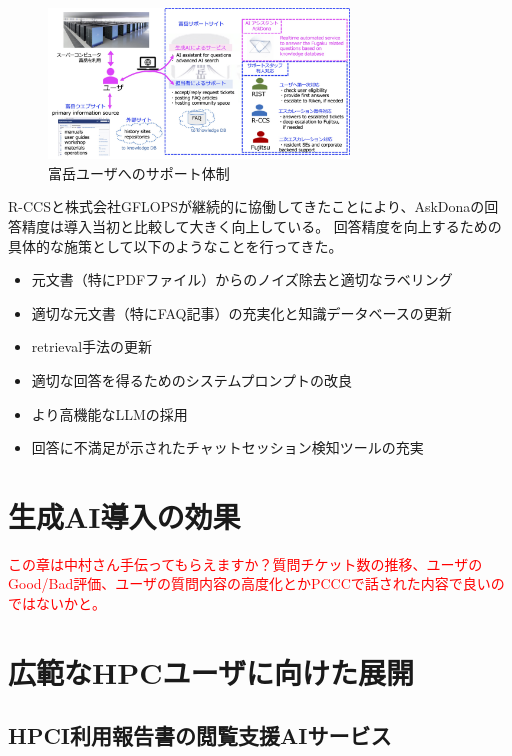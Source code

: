 \documentclass{jsaxiesproc}
\begin{document}
\begin{figure}[htbp]
\includegraphics[width=8.0cm]{figs/FugakuSupport-ALL-J.jpg}
\caption{富岳ユーザへのサポート体制}
\label{fig:FugakuSupport-ALL-J.jpg}
\end{figure}


R-CCSと株式会社GFLOPSが継続的に協働してきたことにより、AskDonaの回答精度は導入当初と比較して大きく向上している。
回答精度を向上するための具体的な施策として以下のようなことを行ってきた。

\begin{itemize}
	\item 元文書（特にPDFファイル）からのノイズ除去と適切なラベリング
	\item 適切な元文書（特にFAQ記事）の充実化と知識データベースの更新
	\item retrieval手法の更新
	\item 適切な回答を得るためのシステムプロンプトの改良
	\item より高機能なLLMの採用
	\item 回答に不満足が示されたチャットセッション検知ツールの充実
\end{itemize}


\section{生成AI導入の効果}


\textcolor{red}{この章は中村さん手伝ってもらえますか？質問チケット数の推移、ユーザのGood/Bad評価、ユーザの質問内容の高度化とかPCCCで話された内容で良いのではないかと。}






\section{広範なHPCユーザに向けた展開}
\subsection{HPCI利用報告書の閲覧支援AIサービス}
\end{document}
